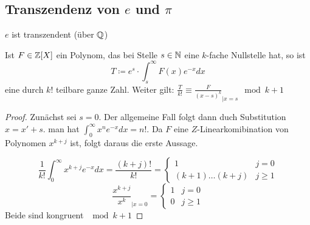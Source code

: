 \documentclass[../main.tex]{subfiles}
\begin{document}
\subsection{Transzendenz von $e$ und $\pi$}
\begin{theorem}
    $e$ ist transzendent (über $\mathbb{Q}$)
\end{theorem}
\begin{lemma}
    Ist $F\in \mathbb{Z}[X]$ ein Polynom, das bei Stelle $s\in\mathbb{N}$ eine $k$-fache Nullstelle hat, so ist $$T\coloneqq e^s\cdot \int_s^\infty F(x)e^{-x} dx$$
    eine durch $k!$ teilbare ganze Zahl.
    Weiter gilt: $\frac{T}{k!} \equiv \frac{F}{(x-s)^k}_{|x=s} \mod k+1$
\end{lemma}
\begin{proof}
    Zunächst sei $s=0$. 
    Der allgemeine Fall folgt dann duch Substitution $x=x'+s$.
    man hat $\int_0^\infty x^n e^{-x} dx = n!$.
    Da $F$ eine $Z$-Linearkomibination von Polynomen $x^{k+j}$ ist, folgt daraus die erste Aussage.

    $$\frac{1}{k!}\int_0^\infty x^{k+j}e^{-x}dx = \frac{(k+j)!}{k!} = \begin{cases}
        1 &  j=0\\
        (k+1)\dots(k+j) & j\geq 1
    \end{cases}$$
    $$\frac{x^{k+j}}{x^k}_{|x=0} = \begin{cases}
        1&j=0\\
        0 & j \geq 1
    \end{cases}$$
    Beide sind kongruent $\mod k+1$
\end{proof}
\end{document}
